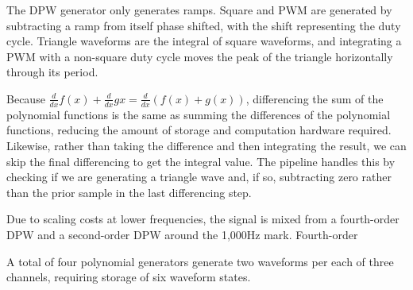 The DPW generator only generates ramps.  Square and PWM are generated by subtracting a ramp from itself phase shifted, with the shift representing the duty cycle.  Triangle waveforms are the integral of square waveforms, and integrating a PWM with a non-square duty cycle moves the peak of the triangle horizontally through its period.

Because $\frac{d}{dx}f(x)+\frac{d}{dx}g{x}=\frac{d}{dx}(f(x)+g(x))$, differencing the sum of the polynomial functions is the same as summing the differences of the polynomial functions, reducing the amount of storage and computation hardware required.  Likewise, rather than taking the difference and then integrating the result, we can skip the final differencing to get the integral value.  The pipeline handles this by checking if we are generating a triangle wave and, if so, subtracting zero rather than the prior sample in the last differencing step.

Due to scaling costs at lower frequencies, the signal is mixed from a fourth-order DPW and a second-order DPW around the 1,000Hz mark.  Fourth-order

A total of four polynomial generators generate two waveforms per each of three channels, requiring storage of six waveform states.


